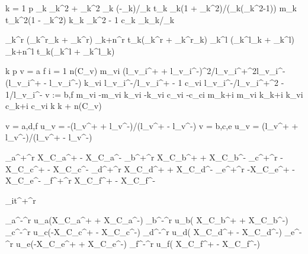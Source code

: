 \newpage
\begin{program}
\BEGIN
	\FOR k = 1 \TO p \DO 	
        \sigma_k \gets \alpha_k^2 + \beta_k^2
		\phi_k \gets (-\beta_k)/\alpha_k
        t_k \gets \beta_k(1 + \phi_k^2)/(\sigma_k(\phi_k^2-1))
        m_k \gets t_k^2(1 - \phi_k^2)
        k_k \gets \phi_k^2 - 1
        c_k \beta_k\phi_k/\sigma_k
        
        _k^r \gets {}(_k^r\phi_k + _k^r)
        _{k+n}^r \gets {}t_k(_k^r + _k^r\phi_k)
        _k^l \gets {}(_k^l\phi_k + _k^l)
        _{k+n}^l \gets{}t_k(_k^l + _k^l\phi_k)
    \OD
    
    k \gets p
    \FOR v = a \TO f \DO
	    \FOR i = 1 \TO n(C_v) \DO 
			m_{vi} \gets (\gls{l}_{v_i^+} + \gls{l}_{v_i^-})^2/\gls{l}_{v_i^+}^2\gls{l}_{v_i^-}(\gls{l}_{v_i^+} - \gls{l}_{v_i^-})
			k_{vi} \gets \gls{l}_{v_i^-}/\gls{l}_{v_i^+} - 1
			c_{vi} \gets \gls{l}_{v_i^-}/\gls{l}_{v_i^+}^2 - 1/\gls{l}_{v_i^-}
			\IF v := b,f 
			\THEN
				m_{vi} \gets -m_{vi}
				k_{vi} \gets -k_{vi}
				c_{vi} \gets -c_{ci}
			\FI
			m_{k+i} \gets m_{vi}
			k_{k+i} \gets k_{vi}
			c_{k+i} \gets c_{vi}			 
		\OD
		k \gets k + n(C_v)
	\OD
	
	\FOR v = a,d,f \DO
	u_v = -(\gls{l}_{v^+} + \gls{l}_{v^-})/(\gls{l}_{v^+} - \gls{l}_{v^-})
	\OD
	\FOR v = b,c,e \DO
	u_v = (\gls{l}_{v^+} + \gls{l}_{v^-})/(\gls{l}_{v^+} - \gls{l}_{v^-})
	\OD
	
    
	_{a^+}^r \gets  {}\gls{X}_{C_a^+} - \Im\gls{X}_{C_a^-}
	_{b^+}^r \gets  {}\gls{X}_{C_b^+} + \gls{X}_{C_b^-}
	_{c^+}^r \gets -\Im\gls{X}_{C_c^+} - \Im\gls{X}_{C_c^-}
	_{d^+}^r \gets  {}\gls{X}_{C_d^+} + \gls{X}_{C_d^-}
	_{e^+}^r \gets -\Im\gls{X}_{C_e^+} - \Im\gls{X}_{C_e^-}
	_{f^+}^r \gets  {}\gls{X}_{C_f^+} - \Im\gls{X}_{C_f^-}

	_{\gls{it}^+}^r \gets {}

    _{a^-}^r \gets  u_a(\gls{X}_{C_a^+} + \Im\gls{X}_{C_a^-})
	_{b^-}^r \gets  u_b(   \gls{X}_{C_b^+} + \gls{X}_{C_b^-})
	_{c^-}^r \gets u_c(-\Im\gls{X}_{C_c^+} - \Im\gls{X}_{C_c^-})
	_{d^-}^r \gets u_d(    \gls{X}_{C_d^+} - \gls{X}_{C_d^-})
	_{e^-}^r \gets u_e(-\Im\gls{X}_{C_e^+} + \Im\gls{X}_{C_e^-})
	_{f^-}^r \gets u_f(    \gls{X}_{C_f^+} - \Im\gls{X}_{C_f^-})
		

\end{program}
